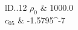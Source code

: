 \documentclass{article}
\begin{document}
\begin{tabular}{lD{.}{.}{12}}
$\rho_0$ & 1000.0  \\
$c_{05}$ & -1.5795^{-7} \\
\end{tabular}
\end{document}
